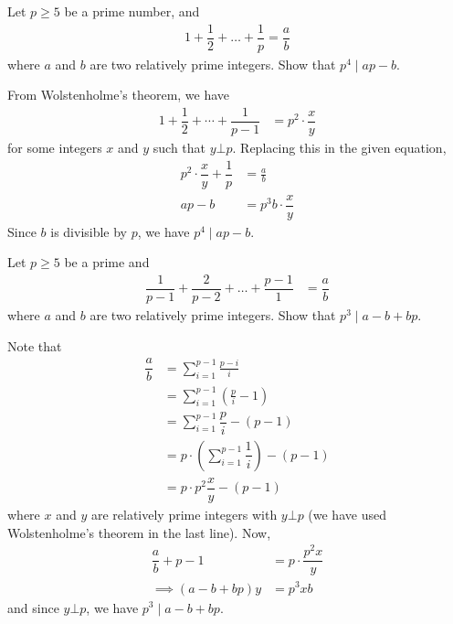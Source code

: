 \documentclass[12pt]{subfile}
\begin{document}
		\begin{problem}
			Let $p \geq 5$ be a prime number, and
				\begin{align*}
					1 + \dfrac{1}{2} + \ldots + \dfrac{1}{p}=\dfrac{a}{b}
				\end{align*}
			where $a$ and $b$ are two relatively prime integers. Show that $p^4\mid ap-b$.
		\end{problem}

		\begin{solution}
			From Wolstenholme's theorem, we have
				\begin{align*}
					1 + \dfrac{1}{2} + \cdots + \dfrac{1}{p-1}
						& = p^2 \cdot \dfrac{x}{y}
				\end{align*}
			for some integers $x$ and $y$ such that $y \bot p$. Replacing this in the given equation,
				\begin{align*}
					p^2 \cdot \dfrac{x}{y}+ \dfrac{1}{p}
						& = \frac{a}{b}\\
					ap-b
						& = p^3b \cdot \dfrac{x}{y}
				\end{align*}
			Since $b$ is divisible by $p$, we have $p^4\mid ap-b$.
		\end{solution}

		\begin{problem}
			Let $p \geq 5$ be a prime and
				\begin{align*}
					\dfrac{1}{p-1} + \dfrac{2}{p-2} + \ldots + \dfrac{p-1}{1}
						& =\dfrac{a}{b}
				\end{align*}
			where $a$ and $b$ are two relatively prime integers. Show that $p^3\mid a-b+bp$.
		\end{problem}

		\begin{solution}
			Note that
				\begin{align*}
					\dfrac{a}{b}
						& = \sum_{i=1}^{p-1} \frac{p-i}{i}\\
						& =\sum_{i=1}^{p-1} \left(\frac{p}{i} -1 \right)\\
						& =\sum_{i=1}^{p-1} \dfrac{p}{i} - (p-1)\\
						& = p\cdot\left(\sum_{i=1}^{p-1} \dfrac{1}{i}\right)-(p-1)\\
						& = p \cdot p^2 \dfrac{x}{y}-(p-1)
				\end{align*}
			where $x$ and $y$ are relatively prime integers with $y \bot p$ (we have used Wolstenholme's theorem in the last line). Now,
				\begin{align*}
					\dfrac a b+p-1
						& =p\cdot\dfrac{p^2x}y\\
					\implies (a-b+bp)y
						& =p^3xb
				\end{align*}
			and since $y\bot p$, we have $p^3\mid a-b+bp$.
		\end{solution}
\end{document}
